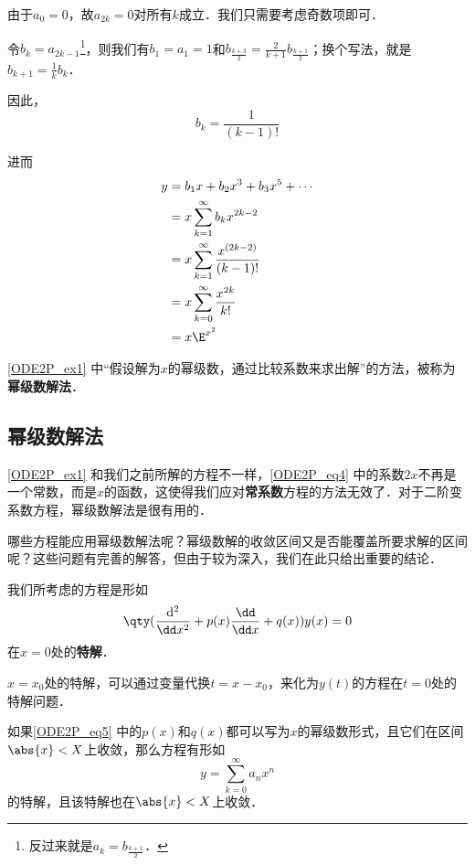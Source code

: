 \begin{example}{}
由于$a_0=0$，故$a_{2k}=0$对所有$k$成立．我们只需要考虑奇数项即可．

令$b_k=a_{2k-1}$\footnote{反过来就是$a_k=b_{\frac{k+1}{2}}$．}，则我们有$b_1=a_1=1$和$b_{\frac{k+3}{2}}=\frac{2}{k+1}b_{\frac{k+1}{2}}$；换个写法，就是$b_{k+1}=\frac{1}{k}b_k$．

因此，
\begin{equation}
b_k=\frac{1}{(k-1)!}
\end{equation}

进而
\begin{equation}\label{ODE2P_eq6}
\begin{aligned}
y&=b_1x+b_2x^3+b_3x^5+\cdots\\
 &=x\sum\limits_{k=1}^\infty b_kx^{2k-2}\\
 &=x\sum\limits_{k=1}^\infty \frac{x^{(2k-2)}}{(k-1)!}\\
 &=x\sum\limits_{k=0}^\infty \frac{x^{2k}}{k!}\\
 &=x\E^{x^2} 
\end{aligned}
\end{equation}

\end{example}

\autoref{ODE2P_ex1} 中“假设解为$x$的幂级数，通过比较系数来求出解”的方法，被称为\textbf{幂级数解法}．


\subsection{幂级数解法}

\autoref{ODE2P_ex1} 和我们之前所解的方程不一样，\autoref{ODE2P_eq4} 中的系数$2x$不再是一个常数，而是$x$的函数，这使得我们应对\textbf{常系数}方程的方法无效了．对于二阶变系数方程，幂级数解法是很有用的．

哪些方程能应用幂级数解法呢？幂级数解的收敛区间又是否能覆盖所要求解的区间呢？这些问题有完善的解答，但由于较为深入，我们在此只给出重要的结论．

我们所考虑的方程是形如
\begin{equation}\label{ODE2P_eq5}
\qty(\frac{\mathrm{d}^2}{\dd x^2}+p(x)\frac{\dd}{\dd x}+q(x))y(x)=0
\end{equation}
在$x=0$处的\textbf{特解}．

$x=x_0$处的特解，可以通过变量代换$t=x-x_0$，来化为$y(t)$的方程在$t=0$处的特解问题．

\begin{theorem}{}
如果\autoref{ODE2P_eq5} 中的$p(x)$和$q(x)$都可以写为$x$的幂级数形式，且它们在区间$\abs{x}<X$上收敛，那么方程有形如
\begin{equation}
y=\sum\limits_{k=0}^\infty a_nx^n
\end{equation}
的特解，且该特解也在$\abs{x}<X$上收敛．
\end{theorem}

